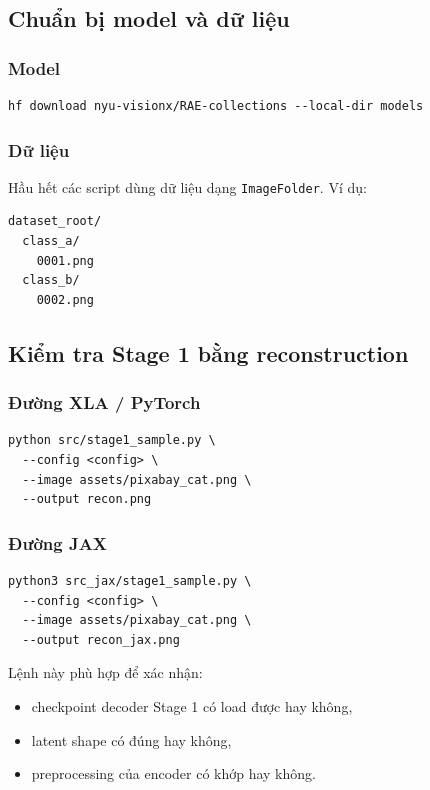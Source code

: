 \subsection{Chuẩn bị model và dữ liệu}

\subsubsection{Model}

\begin{lstlisting}[style=rae]
hf download nyu-visionx/RAE-collections --local-dir models
\end{lstlisting}

\subsubsection{Dữ liệu}

Hầu hết các script dùng dữ liệu dạng \texttt{ImageFolder}. Ví dụ:

\begin{lstlisting}[style=rae]
dataset_root/
  class_a/
    0001.png
  class_b/
    0002.png
\end{lstlisting}

\subsection{Kiểm tra Stage 1 bằng reconstruction}

\subsubsection{Đường XLA / PyTorch}

\begin{lstlisting}[style=rae]
python src/stage1_sample.py \
  --config <config> \
  --image assets/pixabay_cat.png \
  --output recon.png
\end{lstlisting}

\subsubsection{Đường JAX}

\begin{lstlisting}[style=rae]
python3 src_jax/stage1_sample.py \
  --config <config> \
  --image assets/pixabay_cat.png \
  --output recon_jax.png
\end{lstlisting}

Lệnh này phù hợp để xác nhận:

\begin{itemize}[leftmargin=1.5em]
  \item checkpoint decoder Stage 1 có load được hay không,
  \item latent shape có đúng hay không,
  \item preprocessing của encoder có khớp hay không.
\end{itemize}

